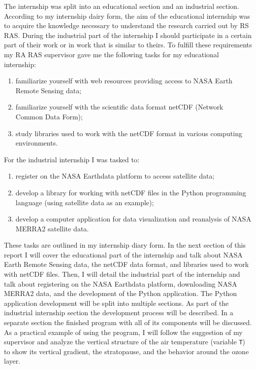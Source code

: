 \documentclass[../00_main.tex]{subfiles}
\begin{document}
The internship was split into an educational section and an industrial section. 
According to my internship dairy form, the aim of the educational internship
was
to acquire the knowledge necessary to understand the research carried out by RS
RAS. During the industrial part of the internship I should participate in
a certain part of their work or in work that is similar to theirs. To fulfill 
these requirements my RA RAS supervisor gave me the following tasks for my 
educational internship:
\begin{enumerate}
    \item familiarize yourself with web resources providing access to NASA 
        Earth Remote Sensing data;
    \item familiarize yourself with the scientific data format netCDF (Network
        Common Data Form);
    \item study libraries used to work with the netCDF format in various 
        computing environments.
\end{enumerate}
For the industrial internship I was tasked to:
\begin{enumerate}
    \item register on the NASA Earthdata platform to access satellite data;
    \item develop a library for working with netCDF files in the Python
        programming language (using satellite data as an example);
    \item develop a computer application for data visualization and reanalysis 
        of NASA MERRA2 satellite data.
\end{enumerate}
These tasks are outlined in my internship diary form. In the next section of
this report I will cover the educational part of the internship and talk about NASA
Earth Remote Sensing data, the netCDF data format, and libraries used to work
with netCDF files. \newline
Then, I will detail the industrial part of the internship
and talk about registering on the NASA Earthdata platform, downloading NASA
MERRA2 data, and the development of the Python application. The Python
application development will be split into multiple sections. As part of the
industrial internship section the development process will be described. In
a separate section the finished program with all of its components will be
discussed. \newline
As a practical example of using the program, I will follow the
suggestion of my supervisor and analyze the vertical structure of the air
temperature (variable \texttt{T}) to show its vertical gradient, the
stratopause, and the behavior around the ozone layer. 
\end{document}
